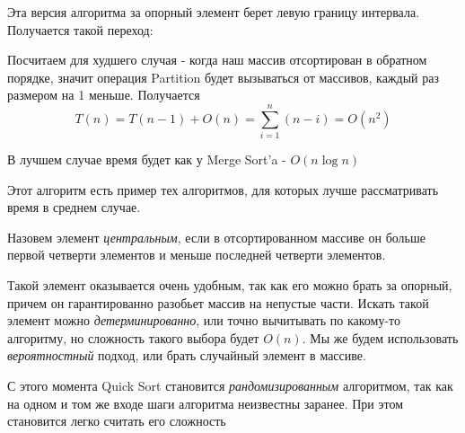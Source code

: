 \documentclass[../book.tex]{subfiles}
\begin{document}
	
	Эта версия алгоритма за опорный элемент берет левую границу интервала. Получается такой переход:
	
	\begin{center}
	\end{center}
	
	\begin{time}
		Посчитаем для худшего случая - когда наш массив отсортирован в обратном порядке, значит операция Partition будет вызываться от массивов, каждый раз размером на 1 меньше. Получается 
		\[
		T(n) = T(n - 1) + O(n) = \sum_{i = 1}^n (n - i) = O(n^2)
		\]
		
		В лучшем случае время будет как у Merge Sort'a - $O(n\log n)$
	\end{time}
	
	Этот алгоритм есть пример тех алгоритмов, для которых лучше рассматривать время в среднем случае. 
		
	\begin{definition}
		Назовем элемент \textit{центральным}, если в отсортированном массиве он больше первой четверти элементов и меньше последней четверти элементов.
	\end{definition}
	
	Такой элемент оказывается очень удобным, так как его можно брать за опорный, причем он гарантированно разобьет массив на непустые части. Искать такой элемент можно \textit{детерминированно}, или точно вычитывать по какому-то алгоритму, но сложность такого выбора будет $O(n)$. Мы же будем использовать \textit{вероятностный} подход, или брать случайный элемент в массиве. 
	
	С этого момента Quick Sort становится \textit{рандомизированным} алгоритмом, так как на одном и том же входе шаги алгоритма неизвестны заранее. При этом становится легко считать его сложность
	
\end{document}
